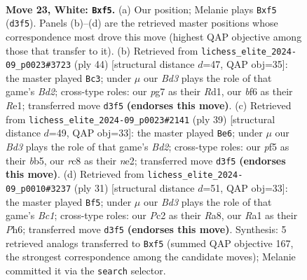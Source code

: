 \documentclass[11pt]{article}
\begin{document}
\clearpage

\begin{figure}[p]\centering
\begin{subfigure}{0.46\textwidth}\centering
\resizebox{\linewidth}{!}{%
\newchessgame
\chessboard[
  setfen={2r2knr/p5pp/2p2b2/5p2/5B2/3B1P1P/PPP3P1/R2R2K1 w - - 0 23},
  showmover=false,
  pgfstyle=straightmove, color=movearrow, markmove={d3-f5}
]}
\caption{}
\end{subfigure}\hfill
\begin{subfigure}{0.46\textwidth}\centering
\resizebox{\linewidth}{!}{%
\newchessgame
\chessboard[
  setfen={5rk1/ppbbr1p1/4pnBp/2P5/1P6/P6P/3B1PP1/3RR1K1 w - - 3 23},
  showmover=false,
  pgfstyle=straightmove, color=movearrow, markmove={d2-c3}
]}
\caption{}
\end{subfigure}
\\[4pt]
\begin{subfigure}{0.46\textwidth}\centering
\resizebox{\linewidth}{!}{%
\newchessgame
\chessboard[
  setfen={r2r2k1/3b1p2/5p1p/pB1pb3/8/7P/P1P1NPP1/1R1R2K1 b - - 0 20},
  showmover=false,
  pgfstyle=straightmove, color=movearrow, markmove={d7-e6}
]}
\caption{}
\end{subfigure}\hfill
\begin{subfigure}{0.46\textwidth}\centering
\resizebox{\linewidth}{!}{%
\newchessgame
\chessboard[
  setfen={r1b2rk1/pp3p2/5p1p/4p3/2B5/4P3/PPR2PPP/4K2R b K - 0 16},
  showmover=false,
  pgfstyle=straightmove, color=movearrow, markmove={c8-f5}
]}
\caption{}
\end{subfigure}
\caption{\textbf{Move 23, White: \texttt{Bxf5}.} (a) Our position; Melanie plays \texttt{Bxf5} (\texttt{d3f5}). Panels (b)--(d) are the retrieved master positions whose correspondence most drove this move (highest QAP objective among those that transfer to it). (b) Retrieved from \texttt{lichess\_elite\_2024-09\_p0023\#3723} (ply 44) [structural distance $d$=47, QAP obj=35]: the master played \texttt{Bc3}; under $\mu$ our \emph{Bd3} plays the role of that game's \emph{Bd2}; cross-type roles: our \emph{p}g7 as their \emph{R}d1, our \emph{b}f6 as their \emph{R}e1; transferred move \texttt{d3f5} \textbf{(endorses this move)}. (c) Retrieved from \texttt{lichess\_elite\_2024-09\_p0023\#2141} (ply 39) [structural distance $d$=49, QAP obj=33]: the master played \texttt{Be6}; under $\mu$ our \emph{Bd3} plays the role of that game's \emph{Bd2}; cross-type roles: our \emph{p}f5 as their \emph{b}b5, our \emph{r}c8 as their \emph{n}e2; transferred move \texttt{d3f5} \textbf{(endorses this move)}. (d) Retrieved from \texttt{lichess\_elite\_2024-09\_p0010\#3237} (ply 31) [structural distance $d$=51, QAP obj=33]: the master played \texttt{Bf5}; under $\mu$ our \emph{Bd3} plays the role of that game's \emph{Bc1}; cross-type roles: our \emph{P}c2 as their \emph{R}a8, our \emph{R}a1 as their \emph{P}h6; transferred move \texttt{d3f5} \textbf{(endorses this move)}. Synthesis: 5 retrieved analogs transferred to \texttt{Bxf5} (summed QAP objective 167, the strongest correspondence among the candidate moves); Melanie committed it via the \texttt{search} selector.}
\label{fig:thought-m44}
\end{figure}
\end{document}
